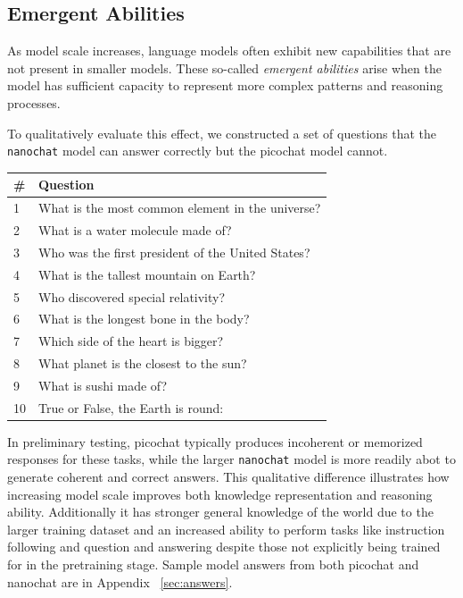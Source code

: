 \documentclass[a4paper,12pt]{article}
\begin{document}
\subsection{Emergent Abilities}

As model scale increases, language models often exhibit new capabilities that are not present in smaller models. These so-called \emph{emergent abilities} arise when the model has sufficient capacity to represent more complex patterns and reasoning processes.

To qualitatively evaluate this effect, we constructed a set of questions that the \texttt{nanochat} model can answer correctly but the picochat model cannot.

\begin{center}
\begin{tabular}{lp{7cm}}
\hline
\# & Question \\
\hline
1 & What is the most common element in the universe? \\
2 & What is a water molecule made of? \\
3 & Who was the first president of the United States? \\
4 & What is the tallest mountain on Earth? \\
5 & Who discovered special relativity? \\
6 & What is the longest bone in the body? \\
7 & Which side of the heart is bigger? \\
8 & What planet is the closest to the sun? \\
9 & What is sushi made of? \\
10 & True or False, the Earth is round: \\
\hline
\end{tabular}
\end{center}

In preliminary testing, picochat typically produces incoherent or memorized responses for these tasks, while the larger \texttt{nanochat} model is more readily abot to generate coherent and correct answers. This qualitative difference illustrates how increasing model scale improves both knowledge representation and reasoning ability. Additionally it has stronger general knowledge of the world due to
the larger training dataset and an increased ability to perform tasks like instruction following and question and answering despite those not explicitly being trained for in the pretraining stage. Sample model answers from both picochat and nanochat are in Appendix ~\ref{sec:answers}.
\end{document}

